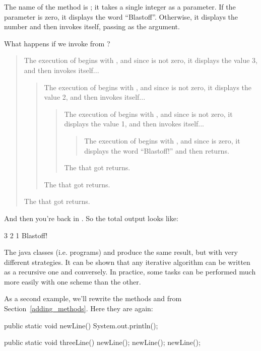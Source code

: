 The name of the method is ; it takes a single integer as a parameter.
If the parameter is zero, it displays the word ``Blastoff''.
Otherwise, it displays the number and then invokes itself, passing  as the argument.

What happens if we invoke  from ?

\vspace{-1ex}
\begin{quote}
The execution of  begins with , and since  is not zero, it displays the value 3, and then invokes itself...
\begin{quote}
The execution of  begins with , and since  is not zero, it displays the value 2, and then invokes itself...
\begin{quote}
The execution of  begins with , and since  is not zero, it displays the value 1, and then invokes itself...
\begin{quote}
The execution of  begins with , and since  is zero, it displays the word ``Blastoff!'' and then returns.
\end{quote}
The  that got  returns.
\end{quote}
The  that got  returns.
\end{quote}
The  that got  returns.
\end{quote}
\vspace{-1ex}

And then you're back in .
So the total output looks like:

\begin{stdout}
3
2
1
Blastoff!
\end{stdout}

The java classes (i.e. programs)  and  produce the same result, but with very different strategies.  It can be shown that any iterative algorithm can be written as a recursive one and conversely.  In practice, some tasks can be performed much more easily with one scheme than the other.

As a second example, we'll rewrite the methods  and  from Section~\ref{adding_methods}.
Here they are again:

\begin{code}
public static void newLine() {
    System.out.println();
}

public static void threeLine() {
    newLine();
    newLine();
    newLine();
}
\end{code}


